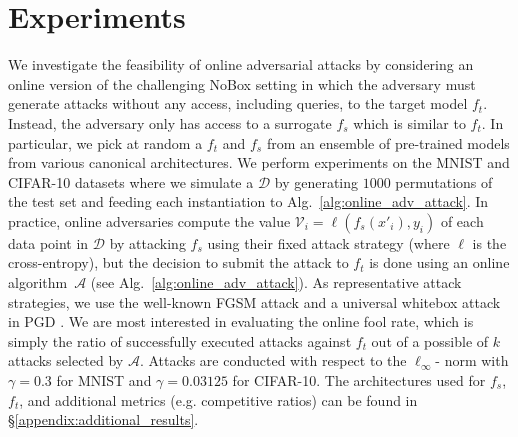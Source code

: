\section{Experiments}
\label{section:experiments}
We investigate the feasibility of online adversarial attacks by considering an online version of the challenging NoBox setting \citep{bose2020adversarial} in which the adversary must generate attacks without any access, including queries, to the target model $f_t$. Instead, the adversary only has access to a surrogate $f_s$ which is similar to $f_t$. In particular, we pick at random a $f_t$ and $f_s$ from an ensemble of pre-trained models from various canonical architectures. We perform experiments on the MNIST \cite{lecun-mnisthandwrittendigit-2010} and CIFAR-10 \cite{krizhevsky2009learning} datasets where we simulate a $\mathcal{D}$ by generating $1000$ permutations of the test set and feeding each instantiation to Alg.~\ref{alg:online_adv_attack}. In practice, online adversaries compute the value 
$\mathcal{V}_i=\ell(f_s(x'_i),y_i)$ 
of each data point in $\mathcal{D}$ by attacking $f_s$ using their fixed attack strategy
(where $\ell$ is the cross-entropy),
but the decision to submit the attack to $f_t$ is done using an online algorithm~$\mathcal{A}$ (see Alg.~\ref{alg:online_adv_attack}). 
As representative attack strategies, we use the well-known FGSM attack \citep{goodfellow2014explaining} and a universal whitebox attack in PGD \citep{madry2017towards}. 
We are most interested in evaluating the online fool rate, which is simply the ratio of successfully executed attacks against $f_t$ out of a possible of $k$ attacks selected by $\mathcal{A}$. Attacks are conducted with respect to the $\ell_\infty$- norm with $\gamma = 0.3$ for MNIST and $\gamma = 0.03125$ for CIFAR-10. The architectures used for $f_s$, $f_t$, and additional metrics (e.g. competitive ratios) can be found in \S\ref{appendix:additional_results}. 

